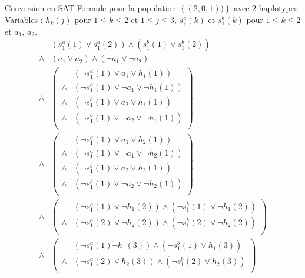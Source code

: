 \documentclass{beamer}
\begin{document}
\begin{frame}
    \begin{block}{Conversion en SAT}
        Formule pour la population $\left\{(2, 0, 1))\right\}$ avec $2$ haplotypes.
        Variables : $h_k(j)$ pour $1\leq k\leq 2$ et $1\leq j\leq 3$, $s^a_i(k)$ et $s^b_1(k)$ pour $1\leq k\leq 2$ et $a_1$, $a_2$.
        \[
            \begin{array}{cl} & (s^a_1(1)\vee s^a_1(2)) \wedge (s^b_1(1)\vee s^b_1(2)) \\
                \wedge & (a_1 \vee a_2) \wedge (\neg a_1 \vee \neg a_2) \\
                \wedge & \left(\begin{array}{cl}
                                   & (\neg s^a_1(1) \vee a_1 \vee h_1(1)) \\
                            \wedge & (\neg s^a_1(1) \vee \neg a_1 \vee \neg h_1(1)) \\
                            \wedge & (\neg s^b_1(1) \vee a_2 \vee h_1(1)) \\
                            \wedge & (\neg s^b_1(1) \vee \neg a_2 \vee \neg h_1(1)) \\
                         \end{array}\right) \\
                \wedge & \left(\begin{array}{cl}
                                   & (\neg s^a_1(1) \vee a_1 \vee h_2(1)) \\
                            \wedge & (\neg s^a_1(1) \vee \neg a_1 \vee \neg h_2(1)) \\
                            \wedge & (\neg s^b_1(1) \vee a_2 \vee h_2(1)) \\
                            \wedge & (\neg s^b_1(1) \vee \neg a_2 \vee \neg h_2(1)) \\
                       \end{array}\right) \\
                \wedge & \left(\begin{array}{cl} & (\neg s^a_1(1) \vee \neg h_1(2)) \wedge (\neg s^b_1(1) \vee \neg h_1(2)) \\
                                    \wedge & (\neg s^a_1(2) \vee \neg h_2(2)) \wedge (\neg s^b_1(2) \vee \neg h_2(2)) \\
                         \end{array}\right) \\
                \wedge & \left(\begin{array}{cl} & (\neg s^a_1(1) \neg h_1(3)) \wedge (\neg s^b_1(1) \vee h_1(3)) \\
                                    \wedge & (\neg s^a_1(2) \vee h_2(3)) \wedge (\neg s^b_1(2) \vee h_2(3)) \\
                         \end{array}\right) \\
            \end{array}
        \]
    \end{block}

\end{frame}
\end{document}
